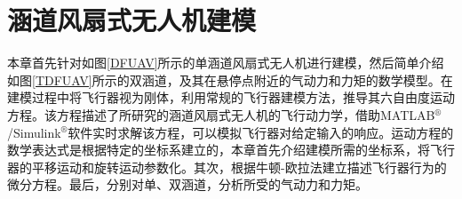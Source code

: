 \chapter{涵道风扇式无人机建模}
%
本章首先针对如图\ref{DFUAV}所示的单涵道风扇式无人机进行建模，然后简单介绍如图\ref{TDFUAV}所示的双涵道，及其在悬停点附近的气动力和力矩的数学模型。在建模过程中将飞行器视为刚体，利用常规的飞行器建模方法，推导其六自由度运动方程。该方程描述了所研究的涵道风扇式无人机的飞行动力学，借助MATLAB$^\circledR$/Simulink$^\circledR$软件实时求解该方程，可以模拟飞行器对给定输入的响应。运动方程的数学表达式是根据特定的坐标系建立的，本章首先介绍建模所需的坐标系，将飞行器的平移运动和旋转运动参数化。其次，根据牛顿-欧拉法建立描述飞行器行为的微分方程。最后，分别对单、双涵道，分析所受的气动力和力矩。
